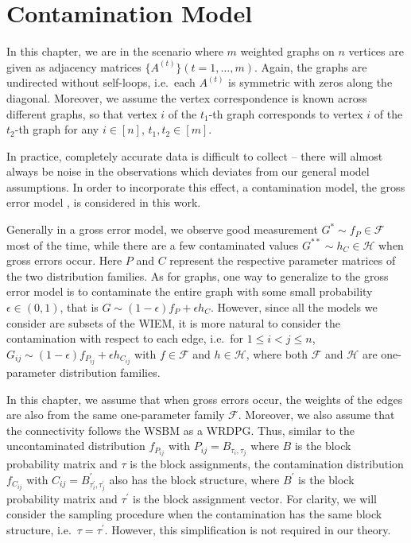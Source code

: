 \section{Contamination Model}
\label{sec:robust_LLG_model}

In this chapter, we are in the scenario where $m$ weighted graphs on $n$ vertices are given as adjacency matrices $\{ A^{(t)} \} (t = 1, \dotsc, m)$. Again, the graphs are undirected without self-loops, i.e.\ each $A^{(t)}$ is symmetric with zeros along the diagonal. Moreover, we assume the vertex correspondence is known across different graphs, so that vertex $i$ of the $t_1$-th graph corresponds to vertex $i$ of the $t_2$-th graph for any $i \in [n]$, $t_1, t_2 \in [m]$.

In practice, completely accurate data is difficult to collect -- there will almost always be noise in the observations which deviates from our general model assumptions. In order to incorporate this effect, a contamination model, the gross error model \citep{AIC:AIC690280519, bickel2007mathematical}, is considered in this work.

Generally in a gross error model, we observe good measurement $G^* \sim f_P \in \mathcal{F}$ most of the time, while there are a few contaminated values $G^{**} \sim h_C \in \mathcal{H}$ when gross errors occur. Here $P$ and $C$ represent the respective parameter matrices of the two distribution families.
As for graphs, one way to generalize to the gross error model is to contaminate the entire graph with some small probability $\epsilon \in (0, 1)$, that is $G \sim (1-\epsilon) f_P + \epsilon h_C$. However, since all the models we consider are subsets of the WIEM, it is more natural to consider the contamination with respect to each edge, i.e.\ for $1 \le i <  j \le n$, $G_{ij} \sim (1-\epsilon) f_{P_{ij}} + \epsilon h_{C_{ij}}$ with $f \in \mathcal{F}$ and $h \in \mathcal{H}$, where both $\mathcal{F}$ and $\mathcal{H}$ are one-parameter distribution families.

In this chapter, we assume that when gross errors occur, the weights of the edges are also from the same one-parameter family $\mathcal{F}$. Moreover, we also assume that the connectivity follows the WSBM as a WRDPG. Thus, similar to the uncontaminated distribution $f_{P_{ij}}$ with $P_{ij} = B_{\tau_i, \tau_j}$ where $B$ is the block probability matrix and $\tau$ is the block assignments, the contamination distribution $f_{C_{ij}}$ with $C_{ij} = B^{\prime}_{\tau^{\prime}_i, \tau^{\prime}_j}$ also has the block structure, where $B^{\prime}$ is the block probability matrix and $\tau^{\prime}$ is the block assignment vector. For clarity, we will consider the sampling procedure when the contamination has the same block structure, i.e.\ $\tau = \tau^{\prime}$. However, this simplification is not required in our theory.

